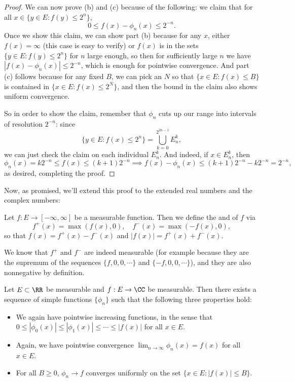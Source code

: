 \begin{proof}
We can now prove (b) and (c) because of the following: we claim that for all $x \in \{y \in E: f(y) \le 2^n\}$,
\[
    0  \le f(x) - \phi_n(x) \le 2^{-n}. 
\]
Once we show this claim, we can show part (b) because for any $x$, either $f(x) = \infty$ (this case is easy to verify) or $f(x)$ is in the sets $\{y \in E: f(y) \le 2^n\}$ for $n$ large enough, so then for sufficiently large $n$ we have $|f(x) - \phi_n(x)| \le 2^{-n}$, which is enough for pointwise convergence. And part (c) follows because for any fixed $B$, we can pick an $N$ so that $\{x \in E: f(x) \le B\}$ is contained in $\{x \in E: f(x) \le 2^N\}$, and then the bound in the claim also shows uniform convergence. 

So in order to show the claim, remember that $\phi_n$ cuts up our range into intervals of resolution $2^{-n}$: since
\[
    \{y \in E: f(x) \le 2^n\} = \bigcup_{k=0}^{2^{2n-1}} E_n^k,
\]
we can just check the claim on each individual $E_n^k$. And indeed, if $x \in E_n^k$, then 
\[
    \phi_n(x) = k 2^{-n} \le f(x) \le (k+1) 2^{-n} \implies f(x) - \phi_n(x) \le (k+1)2^{-n} - k2^{-n} = 2^{-n},
\]
as desired, completing the proof. 
\end{proof}

Now, as promised, we'll extend this proof to the extended real numbers and the complex numbers:

\begin{definition}
Let $f: E \to [-\infty, \infty]$ be a measurable function. Then we define the  and  of $f$ via 
\[
    f^+(x) = \max(f(x), 0), \quad f^-(x) = \max(-f(x), 0),
\]
so that $f(x) = f^+(x) - f^-(x)$ and $|f(x)| = f^+(x) + f^-(x)$.
\end{definition}

We know that $f^+$ and $f^-$ are indeed measurable (for example because they are the supremum of the sequences $\{f, 0, 0, \cdots\}$ and $\{-f, 0, 0, \cdots\}$), and they are also nonnegative by definition.

\begin{theorem}
Let $E \subset \RR$ be measurable and $f: E \to \CC$ be measurable. Then there exists a sequence of simple functions $\{\phi_n\}$ such that the following three properties hold:
\begin{itemize}
\item[(a)] We again have pointwise increasing functions, in the sense that $0 \le |\phi_0(x)| \le |\phi_1(x)| \le \cdots \le |f(x)|$ for all $x \in E$.
\item[(b)] Again, we have pointwise convergence $\lim_{n \to \infty} \phi_n(x) = f(x)$ for all $x \in E$.
\item[(c)] For all $B \ge 0$, $\phi_n \to f$ converges uniformly on the set $\{x \in E: |f(x)| \le B\}$.
\end{itemize}
\end{theorem}

